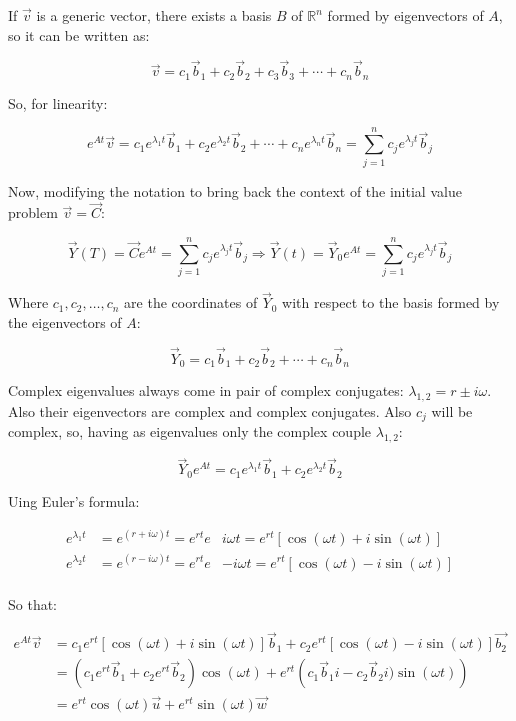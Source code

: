   If $\vec{v}$ is a generic vector, there exists a basis $B$ of $\mathbb{R}^n$ formed by eigenvectors of $A$, so it can be written as:

  $$\vec{v} = c_1\vec{b}_1 + c_2\vec{b}_2 + c_3\vec{b}_3 + \cdots + c_n\vec{b}_n$$

  So, for linearity:

  $$e^{At}\vec{v} = c_1 e^{\lambda_1t}\vec{b}_1 + c_2e^{\lambda_2 t}\vec{b}_2 + \cdots + c_ne^{\lambda_n t}\vec{b}_n = \sum\limits_{j=1}^nc_je^{\lambda_jt}\vec{b}_j$$

  Now, modifying the notation to bring back the context of the initial value problem $\vec{v} = \vec{C}$:

  $$\vec{Y}(T) = \vec{C}e^{At} = \sum\limits_{j=1}^nc_je^{\lambda_j t}\vec{b}_j\Rightarrow \vec{Y}(t) = \vec{Y}_0e^{At} = \sum\limits_{j=1}^nc_je^{\lambda_j t}\vec{b}_j$$

  Where $c_1, c_2, \dots, c_n$ are the coordinates of $\vec{Y}_0$ with respect to the basis formed by the eigenvectors of $A$:

  $$\vec{Y}_0 = c_1\vec{b}_1 + c_2\vec{b}_2 + \cdots + c_n\vec{b}_n$$

  Complex eigenvalues always come in pair of complex conjugates: $\lambda_{1,2} = r\pm i\omega$.
  Also their eigenvectors are complex and complex conjugates.
  Also $c_j$ will be complex, so, having as eigenvalues only the complex couple $\lambda_{1,2}$:

  $$\vec{Y}_0e^{At} = c_1 e^{\lambda_1 t}\vec{b}_1 + c_2e^{\lambda_2 t}\vec{b}_2$$

  Uing Euler's formula:

  \begin{align*}
    e^{\lambda_1 t} &= e^{(r + i\omega)t} = e^{rt}e&{i\omega t} = e^{rt}\left[\cos(\omega t) + i\sin(\omega t)\right]\\
    e^{\lambda_2 t} &= e^{(r - i\omega)t} = e^{rt}e&{-i\omega t} = e^{rt}\left[\cos(\omega t) - i\sin(\omega t)\right]\\
  \end{align*}

  So that:

  \begin{align*}
    e^{At}\vec{v} &= c_1e^{rt}\left[\cos(\omega t) + i\sin(\omega t)\right]\vec{b}_1 + c_2 e^{rt}\left[\cos(\omega t) - i\sin(\omega t)\right]\vec{b_2}\\
                  &= \left(c_1e^{rt}\vec{b}_1 + c_2e^{rt}\vec{b}_2\right)\cos(\omega t) + e^{rt}\left(c_1\vec{b}_1i - c_2\vec{b}_2 i)\sin(\omega t)\right)\\
                  &= e^{rt}\cos(\omega t)\vec{u} + e^{rt}\sin(\omega t)\vec{w}
  \end{align*}


